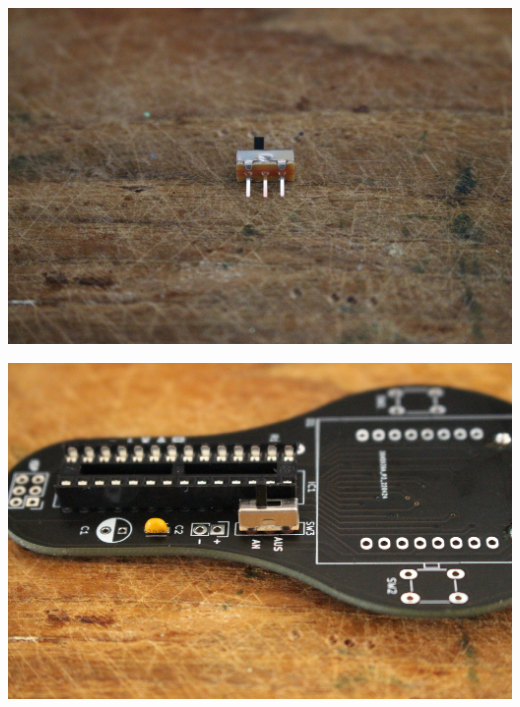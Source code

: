 \documentclass{article}
\begin{document}
\begin{minipage}[b]{0.5\textwidth}
	\includegraphics[width=\textwidth]{Bilder2022/IMG_8218.JPG}
\end{minipage}
\begin{minipage}[b]{0.5\textwidth}
	\includegraphics[width=\textwidth]{Bilder2022/IMG_8219.JPG}
\end{minipage}

\vspace{0.5cm}
\end{document}
